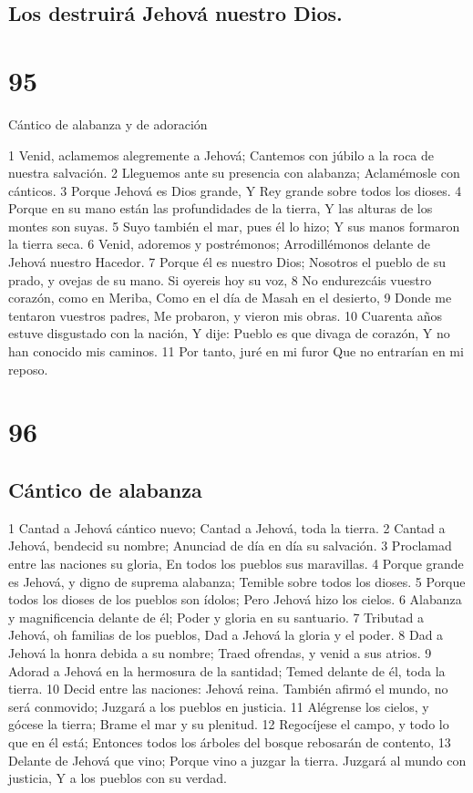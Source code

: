 \section*{Los destruirá Jehová nuestro Dios.}

\chapter{95}

Cántico de alabanza y de adoración

1 Venid, aclamemos alegremente a Jehová;
Cantemos con júbilo a la roca de nuestra salvación.
2 Lleguemos ante su presencia con alabanza;
Aclamémosle con cánticos.
3 Porque Jehová es Dios grande,
Y Rey grande sobre todos los dioses.
4 Porque en su mano están las profundidades de la tierra,
Y las alturas de los montes son suyas.
5 Suyo también el mar, pues él lo hizo;
Y sus manos formaron la tierra seca.
6 Venid, adoremos y postrémonos;
Arrodillémonos delante de Jehová nuestro Hacedor.
7 Porque él es nuestro Dios;
Nosotros el pueblo de su prado, y ovejas de su mano.
Si oyereis hoy su voz,
8 No endurezcáis vuestro corazón, como en Meriba,
Como en el día de Masah en el desierto,
9 Donde me tentaron vuestros padres,
Me probaron,  y vieron mis obras.
10 Cuarenta años estuve disgustado con la nación,
Y dije: Pueblo es que divaga de corazón,
Y no han conocido mis caminos.
11 Por tanto, juré en mi furor
Que no entrarían en mi reposo.

\chapter{96}

\section*{Cántico de alabanza}

1 Cantad a Jehová cántico nuevo;
Cantad a Jehová, toda la tierra.
2 Cantad a Jehová, bendecid su nombre;
Anunciad de día en día su salvación.
3 Proclamad entre las naciones su gloria,
En todos los pueblos sus maravillas.
4 Porque grande es Jehová, y digno de suprema alabanza;
Temible sobre todos los dioses.
5 Porque todos los dioses de los pueblos son ídolos;
Pero Jehová hizo los cielos.
6 Alabanza y magnificencia delante de él;
Poder y gloria en su santuario.
7 Tributad a Jehová, oh familias de los pueblos,
Dad a Jehová la gloria y el poder.
8 Dad a Jehová la honra debida a su nombre;
Traed ofrendas, y venid a sus atrios.
9 Adorad a Jehová en la hermosura de la santidad; 
Temed delante de él, toda la tierra.
10 Decid entre las naciones: Jehová reina.
También afirmó el mundo, no será conmovido;
Juzgará a los pueblos en justicia.
11 Alégrense los cielos, y gócese la tierra;
Brame el mar y su plenitud.
12 Regocíjese el campo, y todo lo que en él está;
Entonces todos los árboles del bosque rebosarán de contento,
13 Delante de Jehová que vino;
Porque vino a juzgar la tierra.
Juzgará al mundo con justicia,
Y a los pueblos con su verdad.

